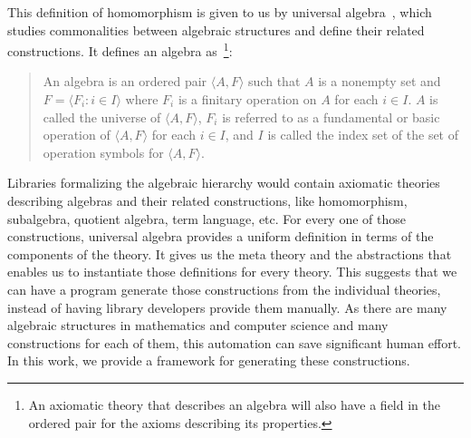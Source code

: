 This definition of homomorphism is given to us by universal algebra~\cite{whitehead1898treatise}, which studies commonalities between algebraic structures and define their related constructions.
It defines an algebra as~\cite{mckenzie1987algebras}\footnote{An axiomatic theory that describes an algebra will also have a field in the ordered pair for the axioms describing its properties.}: 
\begin{quote}
    An algebra is an ordered pair $\langle A, F \rangle$ such that $A$ is a nonempty set and $F = \langle F_i : i \in I \rangle$ where $F_i$ is a finitary operation on $A$ for each $i \in I$. $A$ is called the universe of $\langle A, F \rangle$, $F_i$ is referred to as a fundamental or basic operation of $\langle A, F \rangle$ for each $i \in I$, and $I$ is called the index set of the set of operation symbols for $\langle A, F \rangle$. 
\end{quote}
Libraries formalizing the algebraic hierarchy would contain axiomatic theories describing algebras and their related constructions, like homomorphism, subalgebra, quotient algebra, term language, etc. 
For every one of those constructions, universal algebra provides a uniform definition in terms of the components of the theory. 
It gives us the meta theory and the abstractions that enables us to instantiate those definitions for every theory. This suggests that we can have a program generate those constructions from the individual theories, instead of having library developers provide them manually. As there are many algebraic structures in mathematics and computer science and many constructions for each of them, this automation can save significant human effort. In this work, we provide a framework for generating these constructions. 

